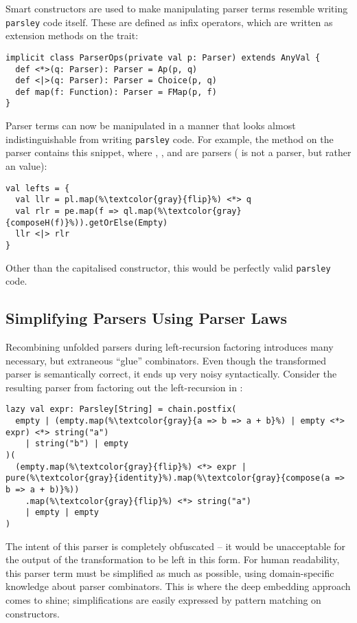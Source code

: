\documentclass[../../main.tex]{subfiles}
\begin{document}
Smart constructors are used to make manipulating parser terms resemble writing \texttt{parsley} code itself.
These are defined as infix operators, which are written as extension methods on the  trait:
\begin{verbatim}
implicit class ParserOps(private val p: Parser) extends AnyVal {
  def <*>(q: Parser): Parser = Ap(p, q)
  def <|>(q: Parser): Parser = Choice(p, q)
  def map(f: Function): Parser = FMap(p, f)
}
\end{verbatim}
%
Parser terms can now be manipulated in a manner that looks almost indistinguishable from writing \texttt{parsley} code.
For example, the  method on the  parser contains this snippet, where , , and  are parsers ( is not a parser, but rather an  value):
\begin{verbatim}
val lefts = {
  val llr = pl.map(%\textcolor{gray}{flip}%) <*> q
  val rlr = pe.map(f => ql.map(%\textcolor{gray}{composeH(f)}%)).getOrElse(Empty)
  llr <|> rlr
}
\end{verbatim}
Other than the capitalised  constructor, this would be perfectly valid \texttt{parsley} code.

\subsection{Simplifying Parsers Using Parser Laws}\label{sec:simplify-parsers}
Recombining unfolded parsers during left-recursion factoring introduces many necessary, but extraneous ``glue'' combinators.
Even though the transformed parser is semantically correct, it ends up very noisy syntactically.
Consider the resulting parser from factoring out the left-recursion in :
\begin{verbatim}
lazy val expr: Parsley[String] = chain.postfix(
  empty | (empty.map(%\textcolor{gray}{a => b => a + b}%) | empty <*> expr) <*> string("a")
    | string("b") | empty
)(
  (empty.map(%\textcolor{gray}{flip}%) <*> expr | pure(%\textcolor{gray}{identity}%).map(%\textcolor{gray}{compose(a => b => a + b)}%))
    .map(%\textcolor{gray}{flip}%) <*> string("a")
    | empty | empty
)
\end{verbatim}
%
The intent of this parser is completely obfuscated -- it would be unacceptable for the output of the transformation to be left in this form.
For human readability, this parser term must be simplified as much as possible, using domain-specific knowledge about parser combinators.
This is where the deep embedding approach comes to shine; simplifications are easily expressed by pattern matching on  constructors.
\end{document}
